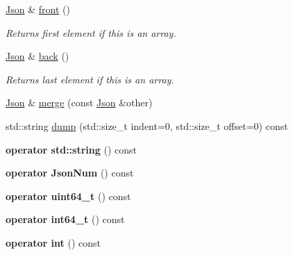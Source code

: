 \begin{DoxyCompactItemize}
\hyperlink{classnta_1_1utils_1_1Json}{Json} \& \hyperlink{classnta_1_1utils_1_1Json_aba3c346a598ddeaec56f016be3da6c50}{front} ()
\begin{DoxyCompactList}\small\item\em Returns first element if this is an array. \end{DoxyCompactList}\item 
\mbox{\label{classnta_1_1utils_1_1Json_a5ac0dc1f03cedaae9944fb7ff71e3893}} 
\hyperlink{classnta_1_1utils_1_1Json}{Json} \& \hyperlink{classnta_1_1utils_1_1Json_a5ac0dc1f03cedaae9944fb7ff71e3893}{back} ()
\begin{DoxyCompactList}\small\item\em Returns last element if this is an array. \end{DoxyCompactList}\item 
\hyperlink{classnta_1_1utils_1_1Json}{Json} \& \hyperlink{classnta_1_1utils_1_1Json_ac33a8a65bdfaff7c365f99c9ca71eeab}{merge} (const \hyperlink{classnta_1_1utils_1_1Json}{Json} \&other)
\item 
std\+::string \hyperlink{classnta_1_1utils_1_1Json_ab0e60f7a55d12aab005d420c8f924035}{dump} (std\+::size\+\_\+t indent=0, std\+::size\+\_\+t offset=0) const
\item 
\mbox{\label{classnta_1_1utils_1_1Json_a8b160dd0764464cafc047b185fdbc2f1}} 
{\bfseries operator std\+::string} () const
\item 
\mbox{\label{classnta_1_1utils_1_1Json_aa1d29487b097a1485c83c1f153e6b1ef}} 
{\bfseries operator Json\+Num} () const
\item 
\mbox{\label{classnta_1_1utils_1_1Json_a40268cb84b0556e07dd9184a98632f5b}} 
{\bfseries operator uint64\+\_\+t} () const
\item 
\mbox{\label{classnta_1_1utils_1_1Json_a06d392cd9356cacdfd356fcb16161220}} 
{\bfseries operator int64\+\_\+t} () const
\item 
\mbox{\label{classnta_1_1utils_1_1Json_a68ad0d74dc88bb726bbe4245097ec209}} 
{\bfseries operator int} () const
\item 
\mbox{\label{classnta_1_1utils_1_1Json_a7a3b26250aeaa82f9ab0c03a80082a0b}} 

\end{DoxyCompactItemize}
